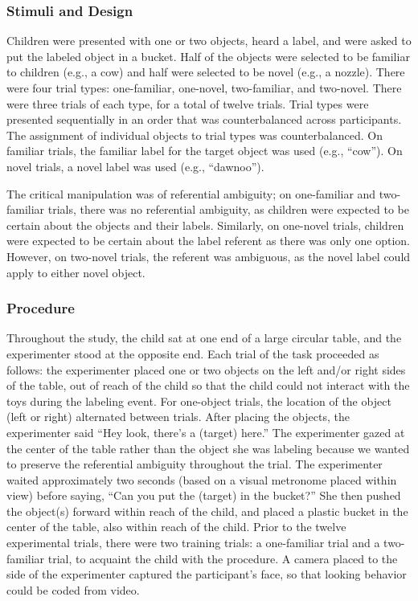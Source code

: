\documentclass[10pt, letterpaper]{article}
\begin{document}
\subsubsection{Stimuli and Design}\label{stimuli-and-design}

Children were presented with one or two objects, heard a label, and were
asked to put the labeled object in a bucket. Half of the objects were
selected to be familiar to children (e.g., a cow) and half were selected
to be novel (e.g., a nozzle). There were four trial types: one-familiar,
one-novel, two-familiar, and two-novel. There were three trials of each
type, for a total of twelve trials. Trial types were presented
sequentially in an order that was counterbalanced across participants.
The assignment of individual objects to trial types was counterbalanced.
On familiar trials, the familiar label for the target object was used
(e.g., ``cow''). On novel trials, a novel label was used (e.g.,
``dawnoo'').

The critical manipulation was of referential ambiguity; on one-familiar
and two-familiar trials, there was no referential ambiguity, as children
were expected to be certain about the objects and their labels.
Similarly, on one-novel trials, children were expected to be certain
about the label referent as there was only one option. However, on
two-novel trials, the referent was ambiguous, as the novel label could
apply to either novel object.

\subsubsection{Procedure}\label{procedure}

Throughout the study, the child sat at one end of a large circular
table, and the experimenter stood at the opposite end. Each trial of the
task proceeded as follows: the experimenter placed one or two objects on
the left and/or right sides of the table, out of reach of the child so
that the child could not interact with the toys during the labeling
event. For one-object trials, the location of the object (left or right)
alternated between trials. After placing the objects, the experimenter
said ``Hey look, there's a (target) here.'' The experimenter gazed at
the center of the table rather than the object she was labeling because
we wanted to preserve the referential ambiguity throughout the trial.
The experimenter waited approximately two seconds (based on a visual
metronome placed within view) before saying, ``Can you put the (target)
in the bucket?'' She then pushed the object(s) forward within reach of
the child, and placed a plastic bucket in the center of the table, also
within reach of the child. Prior to the twelve experimental trials,
there were two training trials: a one-familiar trial and a two-familiar
trial, to acquaint the child with the procedure. A camera placed to the
side of the experimenter captured the participant's face, so that
looking behavior could be coded from video.
\end{document}
